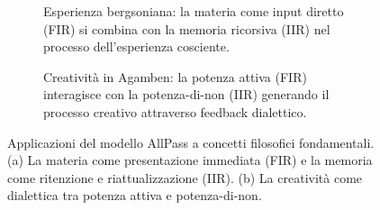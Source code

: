 \documentclass{../../lib/gs}
\begin{document}
%






\begin{figure}[htbp]
  \centering
  \begin{subfigure}[b]{0.48\textwidth}
    \centering
    \caption{Esperienza bergsoniana: la materia come input diretto (FIR) si combina con la memoria ricorsiva (IIR) nel processo dell'esperienza cosciente.}
    \label{esperienza}
  \end{subfigure}
  \hfill
  \begin{subfigure}[b]{0.48\textwidth}
    \centering
    \caption{Creatività in Agamben: la potenza attiva (FIR) interagisce con la potenza-di-non (IIR) generando il processo creativo attraverso feedback dialettico.}
    \label{creativita}
  \end{subfigure}
  \caption{Applicazioni del modello AllPass a concetti filosofici fondamentali. (a) La materia come presentazione immediata (FIR) e la memoria come ritenzione e riattualizzazione (IIR). (b) La creatività come dialettica tra potenza attiva e potenza-di-non.}
  \label{fig:filosofia}
\end{figure}


\end{document}
